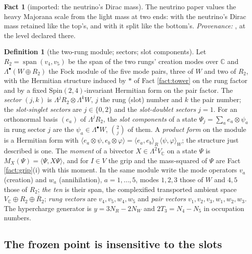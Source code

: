 \documentclass[11pt]{article}
\theoremstyle{definition}
\newtheorem{definition}[theorem]{Definition}
\newtheorem{fact}[theorem]{Fact}
\newcommand{\C}{\mathbb{C}}
\newcommand{\ip}[2]{\langle #1, #2\rangle}
\begin{document}
\begin{fact}[imported: the neutrino's Dirac mass]\label{fact:neutrino}
The neutrino paper values the heavy Majorana scale from the light mass at two ends: with the neutrino's Dirac mass retained like the top's, and with it split like the bottom's. \emph{Provenance:} \cite[Rem.~4.9, with Fact~2.5]{ButlerT15}, at the level declared there.
\end{fact}

\begin{definition}[the two-rung module; sectors; slot components]\label{def:module}
Let $R_{2} = \operatorname{span}(v_{4}, v_{5})$ be the span of the two rungs' creation modes over $\C$ and $\Lambda^{\bullet}(W \oplus R_{2})$ the Fock module of the five mode pairs, three of $W$ and two of $R_{2}$, with the Hermitian structure induced by $*$ of Fact \ref{fact:tower} on the rung factor and by a fixed $\mathrm{Spin}(2,4)$-invariant Hermitian form on the pair factor. The \emph{sector} $(j, k)$ is $\Lambda^{j}R_{2} \otimes \Lambda^{k}W$, $j$ the rung (slot) number and $k$ the pair number; the \emph{slot-singlet sectors} are $j \in \{0, 2\}$ and the \emph{slot-doublet sectors} $j = 1$. For an orthonormal basis $(e_{a})$ of $\Lambda^{j}R_{2}$, the \emph{slot components} of a state $\Psi_{j} = \sum_{a} e_{a} \otimes \psi_{a}$ in rung sector $j$ are the $\psi_{a} \in \Lambda^{\bullet}W$, $\binom{2}{j}$ of them. A \emph{product form} on the module is a Hermitian form with $\ip{e_{a} \otimes \psi}{e_{b} \otimes \varphi} = \ip{e_{a}}{e_{b}}_{R}\,\ip{\psi}{\varphi}_{W}$; the structure just described is one. The \emph{moment} of a bivector $X \in \Lambda^{2}V_{\C}$ on a state $\Psi$ is $M_{X}(\Psi) = \ip{\Psi}{X\Psi}$, and for $I \in V$ the grip and the mass-squared of $\Psi$ are Fact \ref{fact:grip}(i) with this moment.
In the same module write the mode operators $v_{a}$ (creation) and $w_{a}$ (annihilation), $a = 1, \ldots, 5$, modes $1, 2, 3$ those of $W$ and $4, 5$ those of $R_{2}$; \emph{the ten} is their span, the complexified transported ambient space $V_{\C} \oplus R_{2} \oplus \overline{R}_{2}$; \emph{rung vectors} are $v_{4}, v_{5}, w_{4}, w_{5}$ and \emph{pair vectors} $v_{1}, v_{2}, v_{3}, w_{1}, w_{2}, w_{3}$. The hypercharge generator is $y = 3N_{R} - 2N_{W}$ and $2T_{3} = N_{4} - N_{5}$ in occupation numbers.
\end{definition}

\subsection{The frozen point is insensitive to the slots}\label{subsec:blind}
\end{document}
